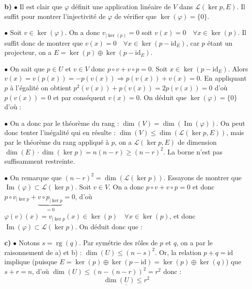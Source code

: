 \documentclass[11pt,a4paper]{article}
\begin{document}
\noindent \textbf{b)} $\bullet$ Il est clair que $\varphi$ définit une application linéaire de $V$ dans $\mathcal{L}(\ker p, E)$. Il suffit pour montrer l'injectivité de $\varphi$ de vérifier que $\ker(\varphi) = \{0\}$.

\noindent $\bullet$ Soit $v \in \ker(\varphi)$. On a donc $v_{|\ker(p)} = 0$ soit $v(x) = 0 \quad \forall x \in \ker(p)$. Il suffit donc de montrer que $v(x) = 0 \quad \forall x \in \ker(p - \mathrm{id}_E)$, car $p$ étant un projecteur, on a $E = \ker(p) \oplus \ker(p - \mathrm{id}_E)$.

\noindent $\bullet$ On sait que $p \in U$ et $v \in V$ donc $p \circ v + v \circ p = 0$. Soit $x \in \ker(p - \mathrm{id}_E)$. Alors $v(x) = v(p(x)) = -p(v(x)) \Rightarrow p(v(x)) + v(x) = 0$. En appliquant $p$ à l'égalité on obtient $p^2(v(x)) + p(v(x)) = 2p(v(x)) = 0$ d'où $p(v(x)) = 0$ et par conséquent $v(x) = 0$. On déduit que $\ker(\varphi) = \{0\}$ d'où :
\begin{center}
\end{center}

\noindent $\bullet$ On a donc par le théorème du rang : $\dim(V) = \dim(\operatorname{Im}(\varphi))$. On peut donc tenter l'inégalité qui en résulte : $\dim(V) \leqslant \dim(\mathcal{L}(\ker p, E))$, mais par le théorème du rang appliqué à $p$, on a $\mathcal{L}(\ker p, E)$ de dimension $\dim(E) \cdot \dim(\ker p) = n(n-r) \geqslant (n-r)^2$. La borne n'est pas suffisamment restreinte.

\noindent $\bullet$ On remarque que $(n-r)^2 = \dim(\mathcal{L}(\ker p))$. Essayons de montrer que $\operatorname{Im}(\varphi) \subset \mathcal{L}(\ker p)$. Soit $v \in V$. On a donc $p \circ v + v \circ p = 0$ et donc $p \circ v_{|\ker p} + \underbrace{v \circ p_{|\ker p}}_{= 0} = 0$, d'où $\varphi(v)(x) = v_{|\ker p}(x) \in \ker(p) \quad \forall x \in \ker(p)$, et donc $\operatorname{Im}(\varphi) \subset \mathcal{L}(\ker p)$. On déduit donc que :
\begin{center}
\end{center}
\vspace{0.5cm}

\noindent \textbf{c)} $\bullet$ Notons $s = \operatorname{rg}(q)$. Par symétrie des rôles de $p$ et $q$, on a par le raisonnement de a) et b) : $\dim(U) \leqslant (n-s)^2$. Or, la relation $p+q = \mathrm{id}$ implique (puisque $E = \ker(p) \oplus \ker(p-\mathrm{id}) = \ker(p) \oplus \ker(q)$) que $s+r = n$, d'où $\dim(U) \leqslant (n-(n-r))^2 = r^2$ donc :
$$ \underline{\dim(U) \leqslant r^2} $$
\end{document}
